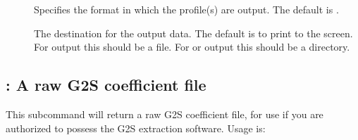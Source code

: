 \documentclass[letterpaper,10pt,english]{sphinxmanual}
\begin{document}
\sphinxAtStartPar
{}
\begin{description}
\item[{}] \leavevmode
\sphinxAtStartPar
Specifies the format in which the profile(s) are output.  The default is .

\item[{}] \leavevmode
\sphinxAtStartPar
The destination for the output data.  The default is to print to the screen.  For  output this should be a file.  For  or  output this should be a directory.

\item[{}] \leavevmode
\sphinxAtStartPar
{}

\sphinxAtStartPar
{}

\end{description}


\subsection{: A raw G2S coefficient file}
\label{\detokenize{userguide:raw-a-raw-g2s-coefficient-file}}
\sphinxAtStartPar
This subcommand will return a raw G2S coefficient file, for use if you are authorized to possess the G2S extraction software.  Usage is:
\end{document}
